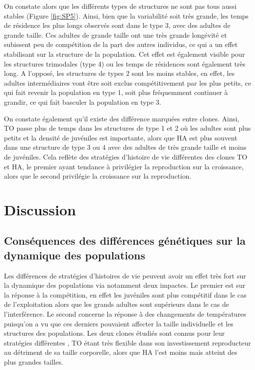 On constate alors que les différents types de structures ne sont pas tous aussi
stables (Figure \ref{fig:SP5}). Ainsi, bien que la variabilité soit très grande,
les temps de résidence les plus longs observés sont dans le type 3, avec des
adultes de grande taille.
Ces adultes de grande taille ont une très grande longévité et subissent peu de
compétition de la part des autres individus, ce qui a un effet stabilisant sur
la structure de la population. Cet effet est également visible pour les
structures trimodales (type 4) ou les temps de résidences sont également très
long. A l'opposé, les structures de types 2 sont les moins stables, en effet,
les adultes intermédiaires vont être soit exclus compétitivement par les plus
petits, ce qui fait revenir la population en type 1, soit plus fréquemment
continuer à grandir, ce qui fait basculer la population en type 3.

On constate également qu'il existe des différence marquées entre clones. Ainsi,
TO passe plus de temps dans les structures de type 1 et 2 où les adultes sont
plus petits et la densité de juvéniles est importante, alors que HA est plus
souvent dans une structure de type 3 ou 4 avec des adultes de très grande taille
et moins de juvéniles. Cela reflète des stratégies d'histoire de vie différentes
des clones TO et HA, le premier ayant tendance à privilégier la reproduction sur
la croissance, alors que le second privilégie la croissance sur la reproduction.

\section{Discussion}

\subsection{Conséquences des différences génétiques sur la dynamique des
populations}

Les différences de stratégies d'histoires de vie peuvent avoir un effet très
fort sur la dynamique des populations via notamment deux impactes. Le premier
est sur la réponse à la compétition, en effet les juvéniles sont plus compétitif
dans le cas de l'exploitation alors que les grands adultes sont supérieurs dans
le cas de l'interférence. Le second concerne la réponse à des changements de
températures puisqu'on a vu que ces derniers pouvaient affecter la taille
individuelle et les structures des populations. Les deux clones étudiés sont
connus pour leur stratégies différentes \autocites{tully2006a,tully2008a}, TO
étant très flexible dans son investissement reproducteur au détriment de sa
taille corporelle, alors que HA l'est moins mais atteint des plus
grandes tailles.

